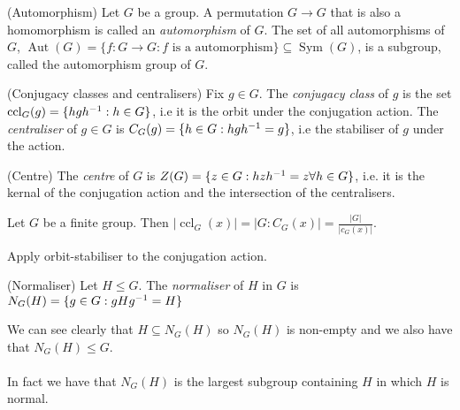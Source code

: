 \documentclass{article}
\DeclareMathOperator{\sym}{Sym}
\DeclareMathOperator{\aut}{Aut}
\DeclareMathOperator{\ccl}{ccl}
\begin{document}
\begin{itemize}
\begin{definition}
	(Automorphism) Let $ G $ be a group. A permutation $ G\to G $ that is also a homomorphism is called an \textit{automorphism} of $ G $. The set of all automorphisms of $ G $, $ \aut(G) =\{f:G\to G: f \text{ is a automorphism}\}\subseteq \sym(G) $, is a subgroup, called the automorphism group of $ G $.
\end{definition}

\begin{definition}
	(Conjugacy classes and centralisers) Fix $ g\in G $. The \textit{conjugacy class} of $ g $ is the set $ \ccl_G(g) = \{hg\inv h: h\in G\} $, i.e it is the orbit under the conjugation action. The \textit{centraliser} of $ g\in G $ is $ C_G(g)=\{h\in G:hg{h}^{-1}=g\} $, i.e the stabiliser of $ g $ under the action.
\end{definition}
\begin{definition}
	(Centre) The \textit{centre} of $ G $ is $ Z(G)=\{z\in G:hz{h}^{-1}=z\forall h\in G\} $, i.e. it is the kernal of the conjugation action and the intersection of the centralisers.
\end{definition}
\begin{corollary}
	Let $ G $ be a finite group. Then $ |\ccl_G(x)|=|G:C_G(x)|=\frac{|G|}{|c_G(x)|} $.
\end{corollary}	
\pf Apply orbit-stabiliser to the conjugation action.
\begin{definition}
	(Normaliser) Let $ H\le G $. The \textit{normaliser} of $ H $ in $ G $ is $ N_G(H)=\{g\in G: gH{g}^{-1} = H\} $
\end{definition}
		We can see clearly that $ H\subseteq N_G(H) $ so $ N_G(H) $ is non-empty and we also have that $ N_G(H)\le G $.\\\\
In fact we have that $ N_G(H) $ is the largest subgroup containing $ H $ in which $ H $ is normal.

\end{itemize}
\end{document}
